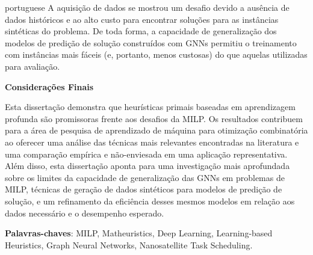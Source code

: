 \begin{resumo}
\begin{otherlanguage*}{portuguese}
A aquisição de dados se mostrou um desafio devido a ausência de dados históricos e ao alto custo para encontrar soluções para as instâncias sintéticas do problema.
De toda forma, a capacidade de generalização dos modelos de predição de solução construídos com GNNs permitiu o treinamento com instâncias mais fáceis (e, portanto, menos custosas) do que aquelas utilizadas para avaliação.


\noindent\textbf{\large Considerações Finais}\newline

Esta dissertação demonstra que heurísticas primais baseadas em aprendizagem profunda são promissoras frente aos desafios da MILP.
Os resultados contribuem para a área de pesquisa de aprendizado de máquina para otimização combinatória ao oferecer uma análise das técnicas mais relevantes encontradas na literatura e uma comparação empírica e não-enviesada em uma aplicação representativa.
Além disso, esta dissertação aponta para uma investigação mais aprofundada sobre os limites da capacidade de generalização das GNNs em problemas de MILP, técnicas de geração de dados sintéticos para modelos de predição de solução, e um refinamento da eficiência desses mesmos modelos em relação aos dados necessário e o desempenho esperado.

\vspace{\onelineskip}

\textbf{Palavras-chaves}: MILP, Matheuristics, Deep Learning, Learning-based Heuristics, Graph Neural Networks, Nanosatellite Task Scheduling.

\end{otherlanguage*}
\end{resumo}

